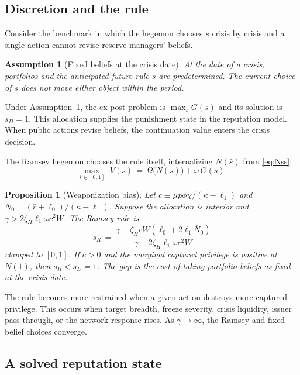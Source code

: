 \documentclass[11pt]{article}
\newtheorem{proposition}{Proposition}
\newtheorem{assumption}{Assumption}
\theoremstyle{definition}
\begin{document}
\subsection{Discretion and the rule}

Consider the benchmark in which the hegemon chooses $s$ crisis by crisis and a single action cannot revise reserve managers' beliefs.

\begin{assumption}[Fixed beliefs at the crisis date]\label{ass:markov}
At the date of a crisis, portfolios and the anticipated future rule $\bar s$ are predetermined. The current choice of $s$ does not move either object within the period.
\end{assumption}

Under Assumption~\ref{ass:markov}, the ex post problem is $\max_sG(s)$ and its solution is $s_D=1$. This allocation supplies the punishment state in the reputation model. When public actions revise beliefs, the continuation value enters the crisis decision.

The Ramsey hegemon chooses the rule itself, internalizing $N(\bar s)$ from \eqref{eq:Nss}:
\begin{equation}
\max_{\bar s \in [0,1]} \,\, V(\bar s) \,=\, \Omega\big(N(\bar s)\big) + \omega\, G(\bar s).
\label{eq:ramsey}
\end{equation}

\begin{proposition}[Weaponization bias]\label{prop:bias}
Let $c \equiv \mu p\phi\chi/(\kappa-\ell_1)$ and $\bar N_0=(\bar r+\ell_0)/(\kappa-\ell_1)$. Suppose the allocation is interior and $\gamma>2\zeta_H\ell_1\omega c^2W$. The Ramsey rule is
\begin{equation}
s_R \,=\, \frac{\gamma-\zeta_HcW(\ell_0+2\ell_1\bar N_0)}{\gamma-2\zeta_H\ell_1\omega c^2W}
\label{eq:sR}
\end{equation}
clamped to $[0,1]$. If $c>0$ and the marginal captured privilege is positive at $N(1)$, then $s_R<s_D=1$. The gap is the cost of taking portfolio beliefs as fixed at the crisis date.
\end{proposition}

The rule becomes more restrained when a given action destroys more captured privilege. This occurs when target breadth, freeze severity, crisis liquidity, issuer pass-through, or the network response rises. As $\gamma\to\infty$, the Ramsey and fixed-belief choices converge.

\subsection{A solved reputation state}\label{sec:reputation}
\end{document}
